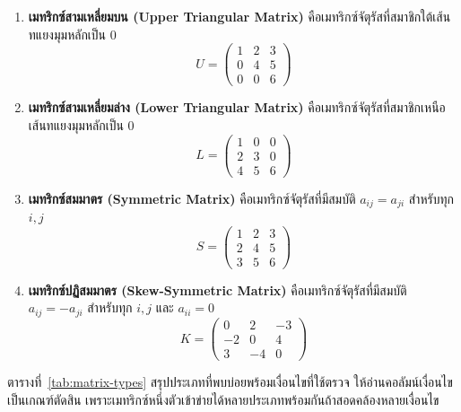 \begin{enumerate}
    \item \textbf{เมทริกซ์สามเหลี่ยมบน (Upper Triangular Matrix)} คือเมทริกซ์จัตุรัสที่สมาชิกใต้เส้นทแยงมุมหลักเป็น 0
    \[U = \begin{pmatrix} 1 & 2 & 3 \\ 0 & 4 & 5 \\ 0 & 0 & 6 \end{pmatrix}\]
    \item \textbf{เมทริกซ์สามเหลี่ยมล่าง (Lower Triangular Matrix)} คือเมทริกซ์จัตุรัสที่สมาชิกเหนือเส้นทแยงมุมหลักเป็น 0
    \[L = \begin{pmatrix} 1 & 0 & 0 \\ 2 & 3 & 0 \\ 4 & 5 & 6 \end{pmatrix}\]
    \item \textbf{เมทริกซ์สมมาตร (Symmetric Matrix)} คือเมทริกซ์จัตุรัสที่มีสมบัติ $a_{ij} = a_{ji}$ สำหรับทุก $i, j$
    \[S = \begin{pmatrix} 1 & 2 & 3 \\ 2 & 4 & 5 \\ 3 & 5 & 6 \end{pmatrix}\]
    \item \textbf{เมทริกซ์ปฏิสมมาตร (Skew-Symmetric Matrix)} คือเมทริกซ์จัตุรัสที่มีสมบัติ $a_{ij} = -a_{ji}$ สำหรับทุก $i, j$ และ $a_{ii} = 0$
    \[K = \begin{pmatrix} 0 & 2 & -3 \\ -2 & 0 & 4 \\ 3 & -4 & 0 \end{pmatrix}\]
\end{enumerate}

ตารางที่~\ref{tab:matrix-types} สรุปประเภทที่พบบ่อยพร้อมเงื่อนไขที่ใช้ตรวจ ให้อ่านคอลัมน์เงื่อนไขเป็นเกณฑ์ตัดสิน เพราะเมทริกซ์หนึ่งตัวเข้าข่ายได้หลายประเภทพร้อมกันถ้าสอดคล้องหลายเงื่อนไข

